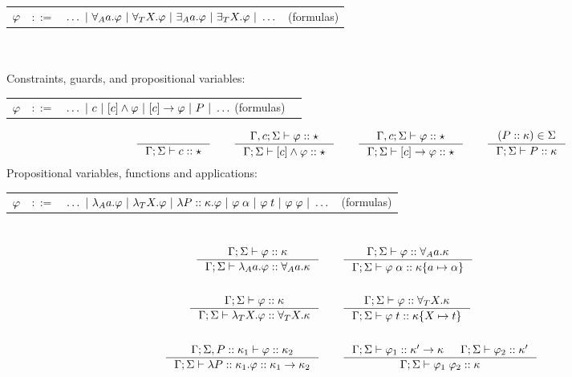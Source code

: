 \documentclass[english, mgr]{iithesis}
\begin{document}
\begin{tabular}{rrlr}
$\varphi$ & $::=$ & $\ldots
               \ |\  \forall_A a . \varphi
               \ |\  \forall_T X . \varphi
               \ |\  \exists_A a . \varphi
               \ |\  \exists_T X . \varphi
               \ |\  \ldots$
    & (formulas)
\end{tabular}
\\ \\
Constraints, guards, and propositional variables:

\begin{tabular}{rrlr}
$\varphi$ & $::=$ & $\ldots
               \ |\  c
               \ |\  [c]\wedge \varphi
               \ |\  [c]\to \varphi
               \ |\  P
               \ |\  \ldots$  (formulas)
\end{tabular}
$$
\inference{
}{
  \cEnv; \kEnv \vdash \fConstr{\constr} \ofkind \kProp
}
\qquad
\inference{
  \cEnv,\constr; \kEnv \vdash \formphi \ofkind \kProp
}{
  \cEnv; \kEnv \vdash \fCAnd{\constr} \formphi \ofkind \kProp
}
\qquad
\inference{
  \cEnv,\constr; \kEnv \vdash \formphi \ofkind \kProp
}{
  \cEnv; \kEnv \vdash \fCImp{\constr} \formphi \ofkind \kProp
}
\qquad
\inference{
  (\propv \ofkind \kind) \in \kEnv
}{
  \cEnv; \kEnv \vdash  \propv \ofkind \kind
}
$$
Propositional variables, functions and applications:

\begin{tabular}{rrlr}
$\varphi$ & $::=$ & $\ldots
               \ |\  \lambda_A a . \varphi
               \ |\  \lambda_T X . \varphi
               \ |\  \lambda P :: \kappa. \varphi
               \ |\  \varphi \;\alpha
               \ |\  \varphi \;t
               \ |\  \varphi \; \varphi
               \ |\  \ldots$
    & (formulas)
\end{tabular}\\
\begin{align*}
\inference{
  \cEnv; \kEnv \vdash \formphi \ofkind \kind
}{
  \cEnv; \kEnv \vdash \fLamAtom{\atomv} \formphi \ofkind \kForallAtom{\atomv}\kind
}
& \qquad
\inference{
  \cEnv;\kEnv\vdash \formphi \ofkind \kForallAtom{\atomv}\kind
}{
  \cEnv;\kEnv\vdash \formphi \fAppAtom{\atomexp} \ofkind \kind \subst{\atomv}{\atomexp}
}
\\ & \\
\inference{
  \cEnv; \kEnv \vdash \formphi \ofkind \kind
}{
  \cEnv; \kEnv \vdash \fLamTerm{\termv} \formphi \ofkind \kForallTerm{\termv}\kind
}
& \qquad
\inference{
  \cEnv;\kEnv\vdash \formphi \ofkind \kForallTerm{\termv}\kind
}{
  \cEnv;\kEnv\vdash \formphi \fAppTerm{\term} \ofkind \kind\subst{\termv}{\term}
}
\\ & \\
\inference{
  \cEnv; \kEnv, \propv \ofkind \kind_1 \vdash \formphi \ofkind \kind_2
}{
  \cEnv; \kEnv \vdash \fLamForm{\propv}{\kind_1} \formphi \ofkind \kind_1 \karrow \kind_2
}
& \qquad
\inference{
  \cEnv; \kEnv \vdash \formphi_1 \ofkind \kind' \karrow \kind &
  \cEnv; \kEnv \vdash \formphi_2 \ofkind \kind'
}{
  \cEnv;\kEnv\vdash \formphi_1 \fApp \formphi_2 \ofkind \kind
}
\end{align*}
\end{document}

